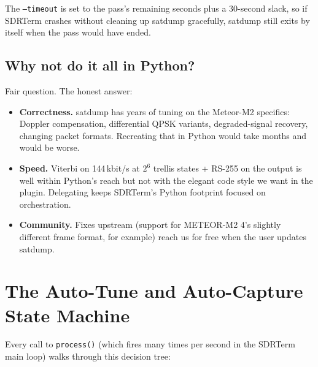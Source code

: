 \documentclass[11pt,a4paper]{article}
\begin{document}
The \texttt{--timeout} is set to the pass's remaining seconds plus a
30-second slack, so if SDRTerm crashes without cleaning up satdump
gracefully, satdump still exits by itself when the pass would have
ended.

\subsection{Why not do it all in Python?}

Fair question.  The honest answer:

\begin{itemize}
  \item \textbf{Correctness.}  satdump has years of tuning on the
        Meteor-M2 specifics: Doppler compensation, differential QPSK
        variants, degraded-signal recovery, changing packet formats.
        Recreating that in Python would take months and would be worse.
  \item \textbf{Speed.}  Viterbi on 144\,kbit/s at $2^{6}$ trellis
        states + RS-255 on the output is well within Python's reach
        but not with the elegant code style we want in the plugin.
        Delegating keeps SDRTerm's Python footprint focused on
        orchestration.
  \item \textbf{Community.}  Fixes upstream (support for METEOR-M2 4's
        slightly different frame format, for example) reach us for
        free when the user updates satdump.
\end{itemize}

\section{The Auto-Tune and Auto-Capture State Machine}

Every call to \texttt{process()} (which fires many times per second
in the SDRTerm main loop) walks through this decision tree:
\end{document}
